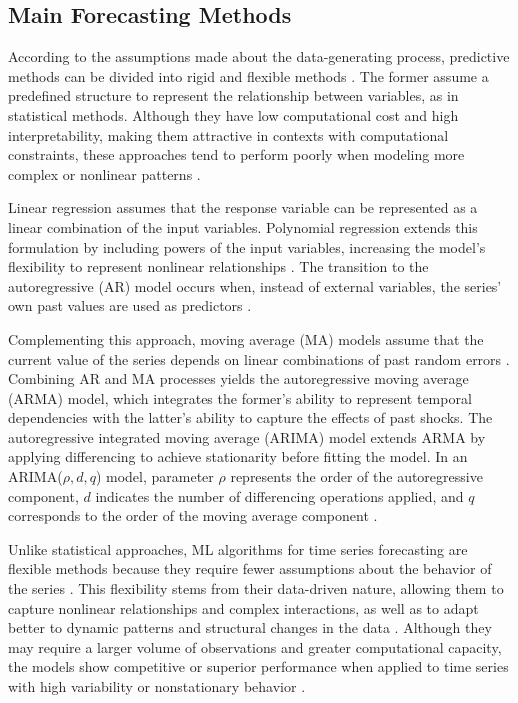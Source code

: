 \documentclass[final,3p,times,twocolumn,authoryear]{elsarticle}
\begin{document}
\subsection{Main Forecasting Methods}
\label{sec_models}

According to the assumptions made about the data-generating process, predictive methods can be divided into rigid and flexible methods \citep{salles_framework_2017}. The former assume a predefined structure to represent the relationship between variables, as in statistical methods. Although they have low computational cost and high interpretability, making them attractive in contexts with computational constraints, these approaches tend to perform poorly when modeling more complex or nonlinear patterns \citep{kontopoulou_areview_2023}.

Linear regression assumes that the response variable can be represented as a linear combination of the input variables. Polynomial regression extends this formulation by including powers of the input variables, increasing the model's flexibility to represent nonlinear relationships \citep{salles_framework_2017}. The transition to the autoregressive (AR) model occurs when, instead of external variables, the series' own past values are used as predictors \citep{shumway_time_2017}.

Complementing this approach, moving average (MA) models assume that the current value of the series depends on linear combinations of past random errors \citep{shumway_time_2017}. Combining AR and MA processes yields the autoregressive moving average (ARMA) model, which integrates the former's ability to represent temporal dependencies with the latter's ability to capture the effects of past shocks. The autoregressive integrated moving average (ARIMA) model extends ARMA by applying differencing to achieve stationarity before fitting the model. In an ARIMA($\rho, d, q$) model, parameter $\rho$ represents the order of the autoregressive component, $d$ indicates the number of differencing operations applied, and $q$ corresponds to the order of the moving average component \citep{box_time_2015}.

Unlike statistical approaches, ML algorithms for time series forecasting are flexible methods because they require fewer assumptions about the behavior of the series \citep{salles_framework_2017}. This flexibility stems from their data-driven nature, allowing them to capture nonlinear relationships and complex interactions, as well as to adapt better to dynamic patterns and structural changes in the data \citep{han_data_2012, kontopoulou_areview_2023}. Although they may require a larger volume of observations and greater computational capacity, the models show competitive or superior performance when applied to time series with high variability or nonstationary behavior \citep{makridakis_statistical_2018, hyndman_forecasting_2021}.
\end{document}
